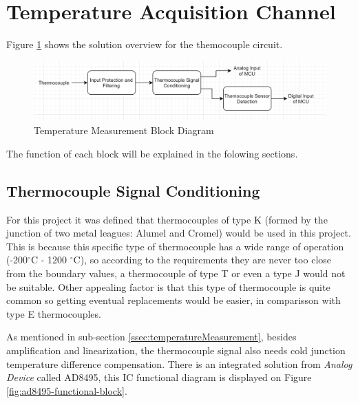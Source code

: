 \section{Temperature Acquisition Channel}\label{sec:temperatura-acquisition-channel}
	
	Figure \ref{fig:temperature-measurement-block-diagram} shows the solution overview for the themocouple circuit.

	\begin{figure}[htbp]
		\centering
		\includegraphics[width=.8\textwidth]{figuras/fig-temperature-measurement-block-diagram}
		\caption{Temperature Measurement Block Diagram}
		\label{fig:temperature-measurement-block-diagram}
	\end{figure}

	The function of each block will be explained in the folowing sections.
	
	\subsection{Thermocouple Signal Conditioning}\label{ssec:thermocouple-signal-conditioning}
		
		For this project it was defined that thermocouples of type K (formed by the junction of two metal leagues: Alumel and Cromel) would be used in this project. This is because this specific type of thermocouple has a wide range of operation (-200$^{\circ}$C - 1200 $^{\circ}$C), so according to the requirements they are never too close from the boundary values, a thermocouple of type T or even a type J would not be suitable. Other appealing factor is that this type of thermocouple is quite common so getting eventual replacements would be easier, in comparisson with type E thermocouples.
		\par
		As mentioned in sub-section \ref{ssec:temperatureMeasurement}, besides amplification and linearization, the thermocouple signal also needs cold junction temperature difference compensation. There is an integrated solution from \textit{Analog Device} called AD8495, this IC functional diagram is displayed on Figure \ref{fig:ad8495-functional-block}.
		

